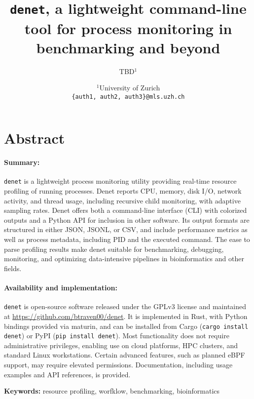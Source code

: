 \documentclass[10pt]{article}
\title{\texttt{denet}, a lightweight command-line tool for process monitoring in benchmarking and beyond}
\author{TBD$^1$}
\date{
	$^1$University of Zurich \\ \texttt{\{auth1, auth2, auth3\}@mls.uzh.ch}\\%
}
\begin{document}
\maketitle
	
\section{Abstract} %

\paragraph{Summary:} \texttt{denet} is a lightweight process monitoring utility providing real-time resource profiling of running processes. Denet reports CPU, memory, disk I/O, network activity, and thread usage, including recursive child monitoring, with adaptive sampling rates. Denet offers both a command-line interface (CLI) with colorized outputs and a Python API for inclusion in other software. Its output formats are structured in either JSON, JSONL, or CSV, and include performance metrics as well as process metadata, including PID and the executed command. The ease to parse profiling results make denet suitable for benchmarking, debugging, monitoring, and optimizing data-intensive pipelines in bioinformatics and other fields. 

\paragraph{Availability and implementation:} \texttt{denet} is open-source software released under the GPLv3 license and maintained at \url{https://github.com/btraven00/denet}. It is implemented in Rust, with Python bindings provided via maturin, and can be installed from Cargo (\texttt{cargo install denet}) or PyPI (\texttt{pip install denet}). Most functionality does not require administrative privileges, enabling use on cloud platforms, HPC clusters, and standard Linux workstations. Certain advanced features, such as planned eBPF support, may require elevated permissions. Documentation, including usage examples and API references, is provided.

\vspace{1cm}

\noindent\textbf{Keywords:} resource profiling, worfklow, benchmarking, bioinformatics

\clearpage
\end{document}

